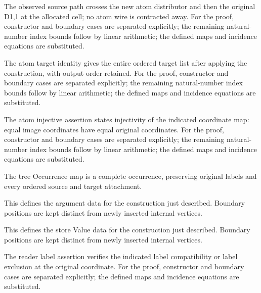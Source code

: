 The observed source path crosses the new atom distributor and then the original D1,1 at the allocated cell; no atom wire is contracted away.
For the proof, constructor and boundary cases are separated explicitly; the remaining natural-number index bounds follow by linear arithmetic; the defined maps and incidence equations are substituted.
\par{}

The atom target identity gives the entire ordered target list after applying the construction, with output order retained.
For the proof, constructor and boundary cases are separated explicitly; the remaining natural-number index bounds follow by linear arithmetic; the defined maps and incidence equations are substituted.
\par{}

The atom injective assertion states injectivity of the indicated coordinate map: equal image coordinates have equal original coordinates.
For the proof, constructor and boundary cases are separated explicitly; the remaining natural-number index bounds follow by linear arithmetic; the defined maps and incidence equations are substituted.
\par{}

The tree Occurrence map is a complete occurrence, preserving original labels and every ordered source and target attachment.
\par{}

This defines the argument data for the construction just described. Boundary positions are kept distinct from newly inserted internal vertices.
\par{}

This defines the store Value data for the construction just described. Boundary positions are kept distinct from newly inserted internal vertices.
\par{}

The reader label assertion verifies the indicated label compatibility or label exclusion at the original coordinate.
For the proof, constructor and boundary cases are separated explicitly; the defined maps and incidence equations are substituted.
\par{}

